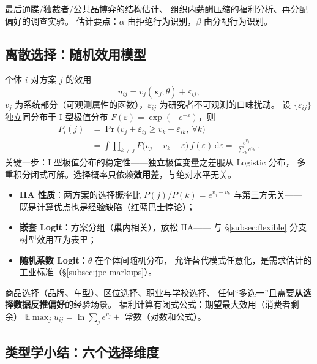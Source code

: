最后通牒/独裁者/公共品博弈的结构估计、
组织内薪酬压缩的福利分析、再分配偏好的调查实验。
估计要点：$\alpha$ 由拒绝行为识别，$\beta$ 由分配行为识别。

\subsection{离散选择：随机效用模型}\label{subsec:rum}

个体 $i$ 对方案 $j$ 的效用
\[
u_{ij}=v_j(\boldsymbol{x}_j;\theta)+\varepsilon_{ij},
\]
$v_j$ 为系统部分（可观测属性的函数），$\varepsilon_{ij}$ 为研究者不可观测的口味扰动。
设 $\{\varepsilon_{ij}\}$ 独立同分布于 I 型极值分布 $F(\varepsilon)=\exp(-e^{-\varepsilon})$，则
\[
\begin{aligned}
P_i(j)&=\Pr\bigl(v_j+\varepsilon_{ij}\ge v_k+\varepsilon_{ik},\ \forall k\bigr)\\
&=\int\prod_{k\ne j}F\bigl(v_j-v_k+\varepsilon\bigr)\,f(\varepsilon)\,\mathrm{d}\varepsilon
=\boxed{\ \frac{e^{v_j}}{\sum_{k}e^{v_k}}\ }.
\end{aligned}
\]
关键一步：I 型极值分布的稳定性——独立极值变量之差服从 Logistic 分布，
多重积分闭式可解。选择概率只依赖\textbf{效用差}，与绝对水平无关。

\begin{itemize}
  \item \textbf{IIA 性质}：两方案的选择概率比 $P(j)/P(k)=e^{v_j-v_k}$ 与第三方无关——
        既是计算优点也是经验缺陷（红蓝巴士悖论）；
  \item \textbf{嵌套 Logit}：方案分组（巢内相关），放松 IIA——
        与 §\ref{subsec:flexible} 分支树型效用互为表里；
  \item \textbf{随机系数 Logit}：$\theta$ 在个体间随机分布，
        允许替代模式任意化，是需求估计的工业标准（§\ref{subsec:jpe-markups}）。
\end{itemize}

商品选择（品牌、车型）、区位选择、职业与学校选择、
任何“多选一”且需要\textbf{从选择数据反推偏好}的经验场景。
福利计算有闭式公式：期望最大效用（消费者剩余）
$\mathbb{E}\max_j u_{ij}=\ln\sum_j e^{v_j}+$ 常数（对数和公式）。

\subsection{类型学小结：六个选择维度}

